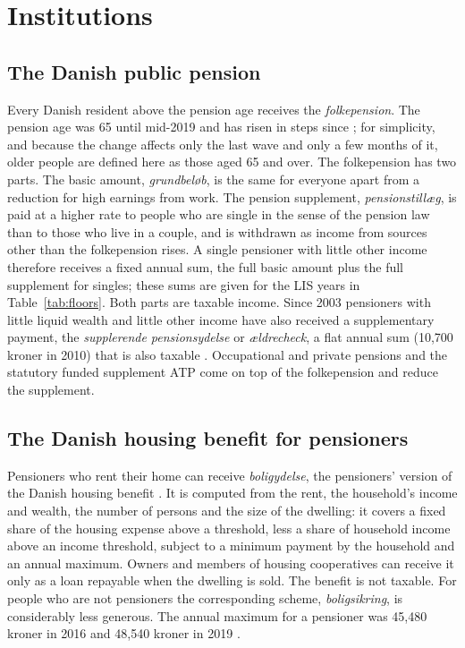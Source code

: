 \section{Institutions}\label{sec:inst}

\subsection{The Danish public pension}

Every Danish resident above the pension age receives the \emph{folkepension}. The pension age was 65 until mid-2019 and has risen in steps since \citep{DKSTARalder}; for simplicity, and because the change affects only the last wave and only a few months of it, older people are defined here as those aged 65 and over. The folkepension has two parts. The basic amount, \emph{grundbeløb}, is the same for everyone apart from a reduction for high earnings from work. The pension supplement, \emph{pensionstillæg}, is paid at a higher rate to people who are single in the sense of the pension law than to those who live in a couple, and is withdrawn as income from sources other than the folkepension rises. A single pensioner with little other income therefore receives a fixed annual sum, the full basic amount plus the full supplement for singles; these sums are given for the LIS years in Table~\ref{tab:floors}. Both parts are taxable income. Since 2003 pensioners with little liquid wealth and little other income have also received a supplementary payment, the \emph{supplerende pensionsydelse} or \emph{ældrecheck}, a flat annual sum (10{,}700 kroner in 2010) that is also taxable \citep{DKVejledning2010}. Occupational and private pensions and the statutory funded supplement ATP come on top of the folkepension and reduce the supplement.

\subsection{The Danish housing benefit for pensioners}

Pensioners who rent their home can receive \emph{boligydelse}, the pensioners' version of the Danish housing benefit \citep{DKBoligstotte2025}. It is computed from the rent, the household's income and wealth, the number of persons and the size of the dwelling: it covers a fixed share of the housing expense above a threshold, less a share of household income above an income threshold, subject to a minimum payment by the household and an annual maximum. Owners and members of housing cooperatives can receive it only as a loan repayable when the dwelling is sold. The benefit is not taxable. For people who are not pensioners the corresponding scheme, \emph{boligsikring}, is considerably less generous. The annual maximum for a pensioner was 45{,}480 kroner in 2016 and 48{,}540 kroner in 2019 \citep{DKVejledning2016,DKVejledning2019}.

